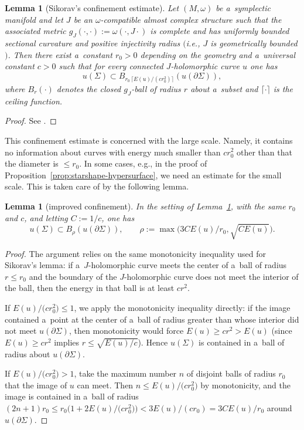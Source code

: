 \documentclass[pdftex]{sigma}
\numberwithin{equation}{section}
\newtheorem{lm}[Theorem]{Lemma}
\theoremstyle{definition}
\begin{document}
\begin{lm}[Sikorav's confinement estimate]\label{lem:sikorav}
 Let $(M,\omega)$ be a~symplectic manifold and let $J$ be an $\omega$-compatible almost complex structure such that the associated metric $g_J(\cdot,\cdot):=\omega(\cdot,J\cdot)$ is complete and has uniformly bounded sectional curvature and positive injectivity radius $($i.e., $J$ is geometrically bounded$)$.
 Then there exist a~constant $r_0>0$ depending on the geometry and a~universal constant $c>0$ such that for every connected $J$-holomorphic curve $u$ one has
 \[
 u(\Sigma)\subset B_{r_0\,\lceil E(u)/(c r_0^2)\rceil}(u(\partial\Sigma)),
 \]
 where $B_{r}(\cdot)$ denotes the closed $g_J$-ball of radius $r$ about a~subset and $\lceil\cdot\rceil$ is the ceiling function.
 \end{lm}
 \begin{proof}
 See \cite[Proposition 4.4.1]{Sikorav}.
 \end{proof}
 This confinement estimate is concerned with the large scale. Namely, it contains no information about curves with energy much smaller than $cr_0^2$ other than that the diameter is $\leq r_0$. In some cases, e.g., in the proof of Proposition~\ref{prop:starshape-hypersurface}, we need an estimate for the small scale. This is taken care of by the following lemma.
 \begin{lm}[improved confinement]\label{lem:sikorav-improved}
 In the setting of Lemma~{\rm\ref{lem:sikorav}}, with the same $r_0$ and $c$, and letting $C := 1/c$, one has
 \[
 u(\Sigma)\subset B_{\rho}(u(\partial\Sigma)),\qquad \rho:=\max\bigl(3CE(u)/r_0,\sqrt{CE(u)}\bigr).
 \]
 \end{lm}
 \begin{proof}
 The argument relies on the same monotonicity inequality used for Sikorav's lemma: if a~$J$-holomorphic curve meets the center of a~ball of radius $r\le r_0$ and the boundary of the $J$-holomorphic curve does not meet the interior of the ball, then the energy in that ball is at least $c r^2$.

 If $E(u)/\bigl(c r_0^2\bigr)\le 1$, we apply the monotonicity inequality directly: if the image contained a~point at the center of a~ball of radius greater than  whose interior did not meet $u(\partial\Sigma)$, then monotonicity would force $E(u)\ge c r^2>E(u)$ (since $E(u)\ge c r^2$ implies $r\le\sqrt{E(u)/c}$). Hence $u(\Sigma)$ is contained in a~ball of radius  about $u(\partial\Sigma)$.

 If $E(u)/\bigl(c r_0^2\bigr)>1$, take the maximum number $n$ of disjoint balls of radius $r_0$ that the image of $u$ can meet. Then $n\le E(u)/\bigl(c r_0^2\bigr)$ by monotonicity, and the image is contained in a~ball of radius $(2n+1)r_0\le r_0\bigl(1+2E(u)/\bigl(c r_0^2\bigr)\bigr)<3E(u)/(cr_0) = 3CE(u)/r_0$ around $u(\partial\Sigma)$.
 \end{proof}
\end{document}
